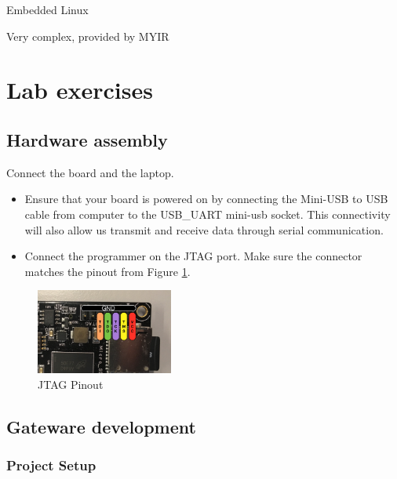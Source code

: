 \documentclass{article}
\newenvironment{myitemize}
{ \begin{itemize}
    \setlength{\itemsep}{0pt}
    \setlength{\parskip}{0pt}
    \setlength{\parsep}{0pt}     }
{ \end{itemize}                  }
\begin{document}
Embedded Linux 

Very complex, provided by  MYIR


\cleardoublepage
\section{Lab exercises}

\subsection{Hardware assembly}

Connect the board and the laptop.

\begin{myitemize}
\item Ensure that your board is powered on by connecting the Mini-USB to USB cable from computer to the USB\_UART mini-usb socket. This connectivity will also allow us transmit and receive data through serial communication.
\item Connect the programmer on the JTAG port. Make sure the connector matches the pinout from Figure \ref{fig:board_pinout}.
\end{myitemize}

 \begin{figure}[h!]
    \centering
    \includegraphics[width=0.4\textwidth]{img/boardpinout.png}
    \caption{JTAG Pinout}
    \label{fig:board_pinout}
\end{figure}


\subsection{Gateware development}

\subsubsection{Project Setup}
\end{document}

